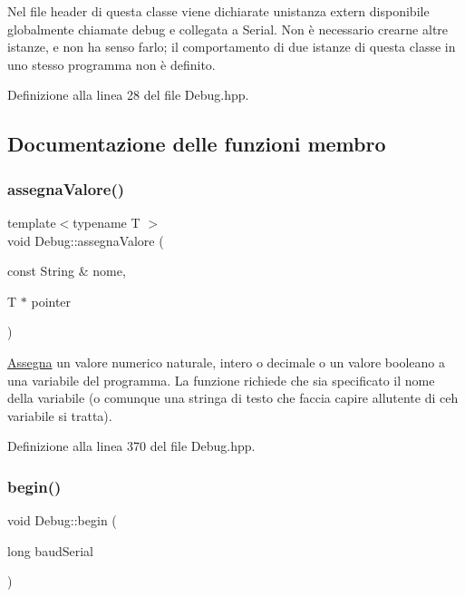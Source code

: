 Nel file header di questa classe viene dichiarate un\textquotesingle{}istanza {\ttfamily extern} disponibile globalmente chiamate {\ttfamily debug} e collegata a {\ttfamily Serial}. Non è necessario crearne altre istanze, e non ha senso farlo; il comportamento di due istanze di questa classe in uno stesso programma non è definito. 

Definizione alla linea 28 del file Debug.\+hpp.



\subsection{Documentazione delle funzioni membro}
\mbox{\label{class_debug_aab7b40f35a2ea8070848b650f8d0bbbe}} 
\subsubsection{\texorpdfstring{assegna\+Valore()}{assegnaValore()}}
{\footnotesize\ttfamily template$<$typename T $>$ \\
void Debug\+::assegna\+Valore (\begin{DoxyParamCaption}\item[{const String \&}]{nome,  }\item[{T $\ast$}]{pointer }\end{DoxyParamCaption})}

\hyperlink{class_assegna}{Assegna} un valore numerico naturale, intero o decimale o un valore booleano a una variabile del programma. La funzione richiede che sia specificato il nome della variabile (o comunque una stringa di testo che faccia capire all\textquotesingle{}utente di ceh variabile si tratta). 

Definizione alla linea 370 del file Debug.\+hpp.

\mbox{\label{class_debug_a8ae9111a766ef45d390a87bdabdc8b23}} 
\subsubsection{\texorpdfstring{begin()}{begin()}}
{\footnotesize\ttfamily void Debug\+::begin (\begin{DoxyParamCaption}\item[{long}]{baud\+Serial }\end{DoxyParamCaption})}

